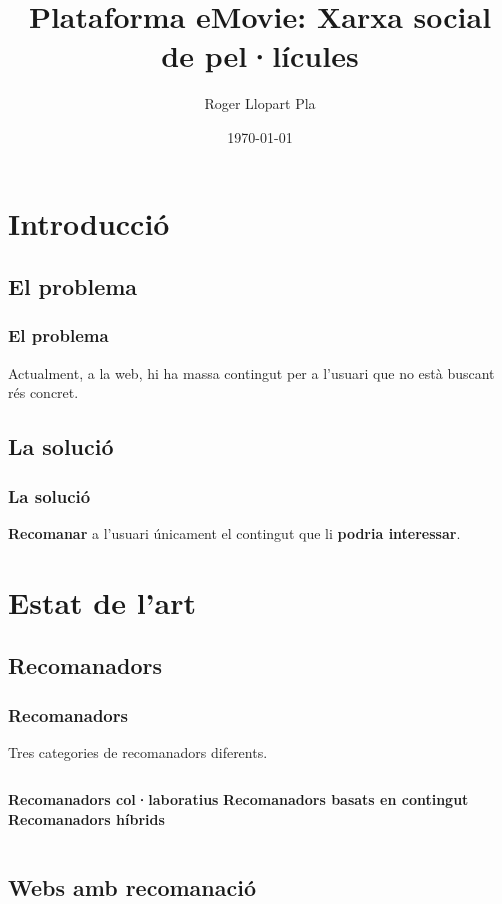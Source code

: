 \documentclass[catalan]{beamer}
\title{Plataforma eMovie: Xarxa social de pel·lícules}
\author{Roger Llopart Pla}
\date{\today}
\begin{document}
\frame{\titlepage}

\section{Introducció}

\subsection{El problema}
\begin{frame}
\frametitle{El problema}
Actualment, a la web, hi ha massa contingut per a l'usuari que no està buscant rés concret.
\end{frame}

\subsection{La solució}
\begin{frame}
\frametitle{La solució}
{\Large{\bf Recomanar} a l'usuari únicament el contingut que li {\bf podria interessar}}.
\end{frame}

\section{Estat de l'art}

\subsection{Recomanadors}
\begin{frame}
\frametitle{Recomanadors}
\begin{center}
Tres categories de recomanadors diferents.
\end{center}
\vfill
\begin{columns}[c]
\textbf<2>{Recomanadors col·laboratius}
\textbf<3>{Recomanadors basats en contingut}
\textbf<4>{Recomanadors híbrids}
\end{columns}
\end{frame}

\subsection{Webs amb recomanació}
\end{document}
